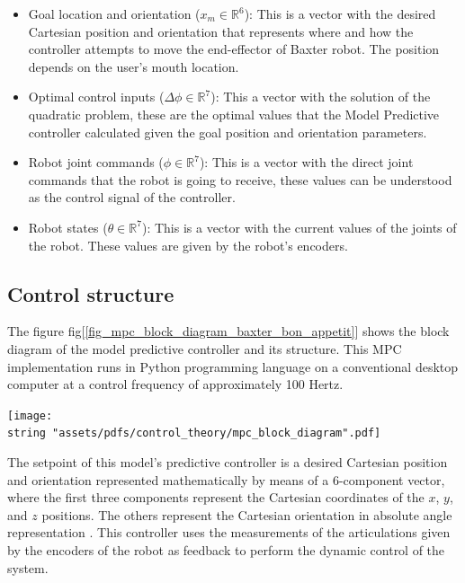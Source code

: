\documentclass[11pt]{report} %
\begin{document}
\begin{itemize}
    \item Goal location and orientation ($x_{m} \in \mathbb{R}^6$): This is a vector with the desired Cartesian position and orientation that represents where and how the controller attempts to move the end-effector of Baxter robot. The position depends on the user's mouth location. 
    \item Optimal control inputs ($\Delta\phi \in \mathbb{R}^7$): This a vector with the solution of the quadratic problem, these are the optimal values that the Model Predictive controller calculated given the goal position and orientation parameters.
    \item Robot joint commands ($\phi \in \mathbb{R}^7$): This is a vector with the direct joint commands that the robot is going to receive, these values can be understood as the control signal of the controller.
    \item Robot states ($\theta \in \mathbb{R}^7$): This is a vector with the current values of the joints of the robot. These values are given by the robot's encoders.
\end{itemize}

\subsection{Control structure}

The figure fig[\ref{fig_mpc_block_diagram_baxter_bon_appetit}] shows the block diagram of the model predictive controller and its structure. This MPC implementation runs in Python programming language on a conventional desktop computer at a control frequency of approximately 100 Hertz.\\

\begin{center}
\texttt{[image: \\string "assets/pdfs/control\_theory/mpc\_block\_diagram".pdf]}
\bigbreak
\begin{minipage}{\linewidth} %
\label{fig_mpc_block_diagram_baxter_bon_appetit}
\end{minipage} \end{center}

The setpoint of this model's predictive controller is a desired Cartesian position and orientation represented mathematically by means of a 6-component vector, where the first three components represent the Cartesian coordinates of the $x$, $y$, and $z$ positions. The others represent the Cartesian orientation in absolute angle representation \citep{cite_craig_robotics}. This controller uses the measurements of the articulations given by the encoders of the robot as feedback to perform the dynamic control of the system.\\
\end{document}
